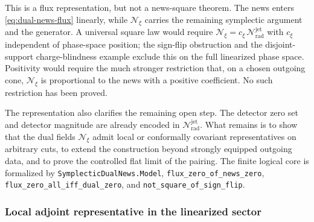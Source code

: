 \documentclass[11pt,a4paper]{article}
\newcommand{\cN}{\mathcal{N}}
\begin{document}
This is a flux representation, but not a news-square theorem.  The news enters \eqref{eq:dual-news-flux} linearly, while \(\mathscr N_\xi\) carries the remaining symplectic argument and the generator.  A universal square law would require \(\mathscr N_\xi=c_\xi\,\cN^{\mathrm{jet}}_{\mathrm{rad}}\) with \(c_\xi\) independent of phase-space position; the sign-flip obstruction and the disjoint-support charge-blindness example exclude this on the full linearized phase space.  Positivity would require the much stronger restriction that, on a chosen outgoing cone, \(\mathscr N_\xi\) is proportional to the news with a positive coefficient.  No such restriction has been proved.

The representation also clarifies the remaining open step.  The detector zero set and detector magnitude are already encoded in \(\cN^{\mathrm{jet}}_{\mathrm{rad}}\).  What remains is to show that the dual fields \(\mathscr N_\xi\) admit local or conformally covariant representatives on arbitrary cuts, to extend the construction beyond strongly equipped outgoing data, and to prove the controlled flat limit of the pairing.  The finite logical core is formalized by \texttt{SymplecticDualNews.Model}, \texttt{flux\_zero\_of\_news\_zero}, \texttt{flux\_zero\_all\_iff\_dual\_zero}, and \texttt{not\_square\_of\_sign\_flip}.

\subsubsection{Local adjoint representative in the linearized sector}
\end{document}
